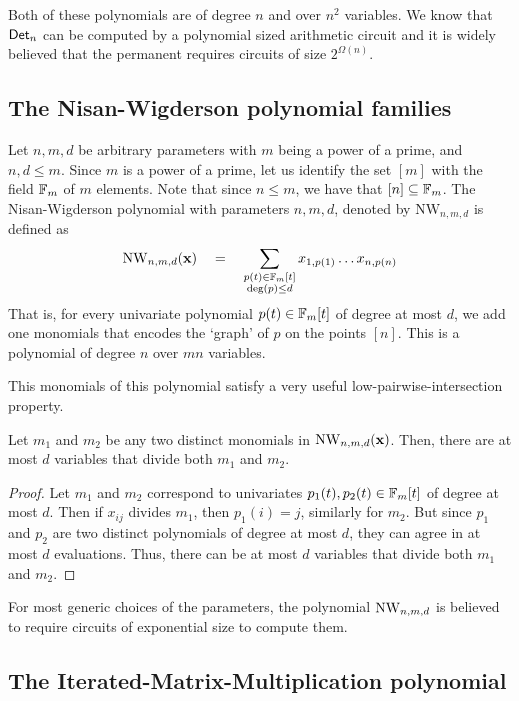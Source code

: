 Both of these polynomials are of degree $n$ and over $n^2$ variables. We know that $\mathsf{Det}_n$ can be computed by a polynomial sized arithmetic circuit and it is widely believed that the permanent requires circuits of size $2^{\Omega(n)}$. 



\subsection*{The Nisan-Wigderson polynomial families}

Let $n,m,d$ be arbitrary parameters with $m$ being a power of a prime, and $n,d\leq m$. Since $m$ is a power of a prime, let us identify the set $[m]$ with the field $\mathbb{F}_m$ of $m$ elements. Note that since $n \leq m$, we have that $[n] \subseteq \mathbb{F}_m$. The Nisan-Wigderson polynomial with parameters $n,m,d$, denoted by $\mathrm{NW}_{n,m,d}$ is defined as
\[
\mathrm{NW}_{n,m,d}(\mathbf{x}) \quad = \quad \sum_{\substack{p(t) \in \mathbb{F}_m[t]\\ \deg(p) \leq d}} x_{1,p(1)}\dots x_{n,p(n)}
\]
That is, for every univariate polynomial $p(t) \in \mathbb{F}_m[t]$ of degree at most $d$, we add one monomials that encodes the `graph' of $p$ on the points $[n]$. This is a polynomial of degree $n$ over $mn$ variables.

This monomials of this polynomial satisfy a very useful low-pairwise-intersection property. 

\begin{lemma}\label{lem:NW-low-intersection}
Let $m_1$ and $m_2$ be any two distinct monomials in $\mathrm{NW}_{n,m,d}(\mathbf{x})$. Then, there are at most $d$ variables that divide both $m_1$ and $m_2$. 
\end{lemma}
\begin{proof}
Let $m_1$ and $m_2$ correspond to univariates $p_1(t), p_2(t) \in \mathbb{F}_m[t]$ of degree at most $d$. Then if $x_{ij}$ divides $m_1$, then $p_1(i) = j$, similarly for $m_2$. But since $p_1$ and $p_2$ are two distinct polynomials of degree at most $d$, they can agree in at most $d$ evaluations. Thus, there can be at most $d$ variables that divide both $m_1$ and $m_2$. 
\end{proof}

For most generic choices of the parameters, the polynomial $\mathrm{NW}_{n,m,d}$ is believed to require circuits of exponential size to compute them. 

\subsection*{The Iterated-Matrix-Multiplication polynomial}

